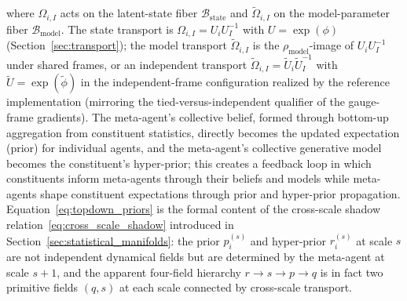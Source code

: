 \documentclass[11pt]{article}
\begin{document}
where $\Omega_{i,I}$ acts on the latent-state fiber $\mathcal{B}_{\mathrm{state}}$ and $\tilde\Omega_{i,I}$ on the model-parameter fiber $\mathcal{B}_{\mathrm{model}}$. The state transport is $\Omega_{i,I} = U_i U_I^{-1}$ with $U = \exp(\phi)$ (Section~\ref{sec:transport}); the model transport $\tilde\Omega_{i,I}$ is the $\rho_{\mathrm{model}}$-image of $U_i U_I^{-1}$ under shared frames, or an independent transport $\tilde\Omega_{i,I} = \tilde U_i \tilde U_I^{-1}$ with $\tilde U = \exp(\tilde\phi)$ in the independent-frame configuration realized by the reference implementation (mirroring the tied-versus-independent qualifier of the gauge-frame gradients). The meta-agent's collective belief, formed through bottom-up aggregation from constituent statistics, directly becomes the updated expectation (prior) for individual agents, and the meta-agent's collective generative model becomes the constituent's hyper-prior; this creates a feedback loop in which constituents inform meta-agents through their beliefs and models while meta-agents shape constituent expectations through prior and hyper-prior propagation. Equation~\eqref{eq:topdown_priors} is the formal content of the cross-scale shadow relation~\eqref{eq:cross_scale_shadow} introduced in Section~\ref{sec:statistical_manifolds}: the prior $p_i^{(s)}$ and hyper-prior $r_i^{(s)}$ at scale $s$ are not independent dynamical fields but are determined by the meta-agent at scale $s+1$, and the apparent four-field hierarchy $r \to s \to p \to q$ is in fact two primitive fields $(q, s)$ at each scale connected by cross-scale transport.
\end{document}
